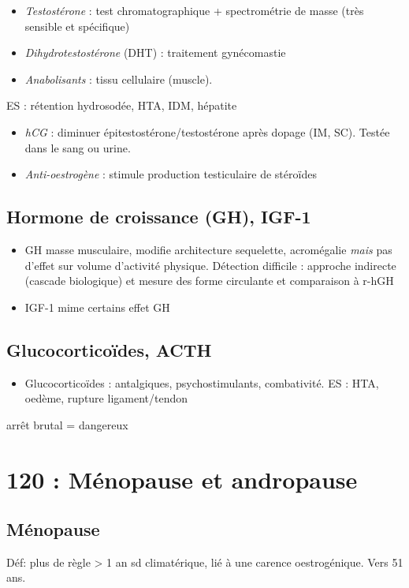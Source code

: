 \documentclass[11pt]{article}
\begin{document}
\vspace*{0.5cm}
\begin{itemize}
\item \emph{Testostérone} : test chromatographique + spectrométrie de masse (très sensible
et spécifique)
\item \emph{Dihydrotestostérone} (DHT) : traitement gynécomastie
\item \emph{Anabolisants} : \inc tissu cellulaire (muscle).
\end{itemize}
ES : rétention hydrosodée, HTA, IDM, hépatite
\begin{itemize}
\item \emph{hCG} : diminuer épitestostérone/testostérone après dopage (IM, SC). Testée dans
le sang ou urine.
\item \emph{Anti-oestrogène} : stimule production testiculaire de stéroïdes
\end{itemize}

\subsection{Hormone de croissance (GH), IGF-1}
\label{sec:org5fe3980}
\begin{itemize}
\item GH \inc masse musculaire, modifie architecture sequelette, acromégalie \emph{mais}
pas d'effet sur volume d'activité physique. Détection difficile : approche
indirecte (cascade biologique) et mesure des forme circulante et comparaison à r-hGH
\item IGF-1 mime certains effet GH
\end{itemize}

\subsection{Glucocorticoïdes, ACTH}
\label{sec:org6d2d6ac}
\begin{itemize}
\item Glucocorticoïdes : antalgiques, psychostimulants, combativité. ES : HTA,
oedème, rupture ligament/tendon
\end{itemize}
\danger arrêt brutal = dangereux \skull

\section{120 : Ménopause et andropause}
\label{sec:org94c4eb8}
\label{sec:120}
\subsection{Ménopause}
\label{sec:org37cff32}
Déf: plus de règle > 1 an \textpm{} sd climatérique, lié à une carence
oestrogénique. Vers 51 ans.
\end{document}
